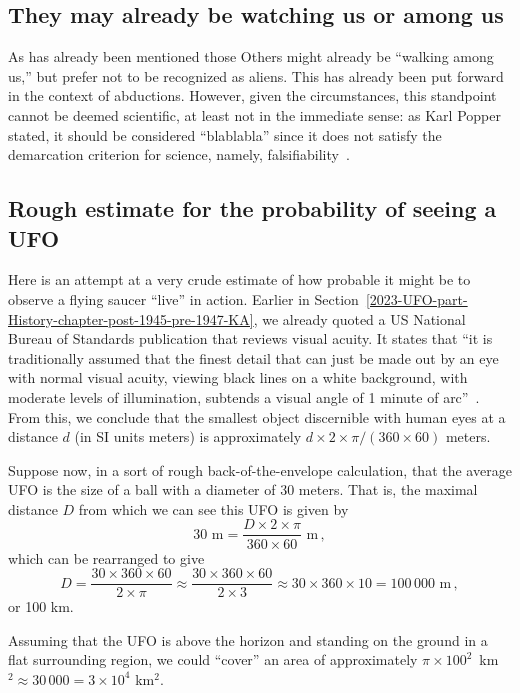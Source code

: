 \subsection{They may already be watching us or among us}


As has already been mentioned those Others might already be ``walking among us,'' but prefer not to be recognized as aliens.
This has already been put forward in the context of abductions.
However, given the circumstances, this standpoint cannot be deemed scientific, at least not in the immediate sense:
as Karl Popper~\cite{Popper-Kreuzer-1079} stated, it should be considered ``blablabla'' since it does not satisfy the demarcation criterion for science, namely, falsifiability~\cite{popper,popper-en}.


\subsection{Rough estimate for the probability of seeing a UFO}

Here is an attempt at a very crude estimate of how probable it might be to observe a flying saucer ``live'' in action.
Earlier in Section~\ref{2023-UFO-part-History-chapter-post-1945-pre-1947-KA},
we already quoted a US National Bureau of Standards publication that reviews visual acuity.
It states that ``it
is traditionally assumed that the finest detail that can just be made out by an eye with normal visual acuity,
viewing black lines on a white background, with moderate levels of illumination, subtends a visual angle of
1 minute of arc''~\cite[p.~10]{Howett1983Jul}.
From this, we conclude that the smallest object discernible with human eyes at a distance $d$ (in SI units meters) is approximately
$d \times 2 \times \pi /(360\times 60)$ meters.

Suppose now, in a sort of rough back-of-the-envelope calculation, that the average UFO is the size of a ball with a diameter of 30 meters. That is, the maximal distance $D$ from which we can see this UFO is given by
\[
30\text{ m} = \frac{D \times 2 \times \pi}{360 \times 60}\text{ m}\,,
\]
which can be rearranged to give
\[
D = \frac{30 \times 360 \times 60}{2 \times \pi} \approx \frac{30 \times 360 \times 60}{2 \times 3} \approx 30 \times 360 \times 10 =
100\,000\text{ m}\,,
\]
or 100 km.

Assuming that the UFO is above the horizon and standing on the ground in a flat surrounding region, we could ``cover'' an area of approximately $\pi \times 100^2$~km$^2 \approx 30\,000 = 3 \times 10^4$ km$^2$.

